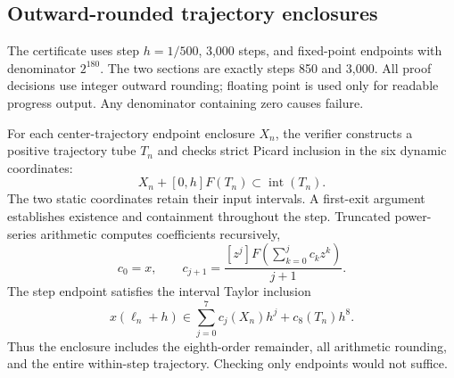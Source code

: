 \subsection{Outward-rounded trajectory enclosures}
The certificate uses step $h=1/500$, 3,000 steps, and fixed-point endpoints with denominator $2^{180}$. The two sections are exactly steps 850 and 3,000. All proof decisions use integer outward rounding; floating point is used only for readable progress output. Any denominator containing zero causes failure.

For each center-trajectory endpoint enclosure $X_n$, the verifier constructs a positive trajectory tube $T_n$ and checks strict Picard inclusion in the six dynamic coordinates:
\begin{equation}
X_n+[0,h]F(T_n)\subset\operatorname{int}(T_n).
\end{equation}
The two static coordinates retain their input intervals. A first-exit argument establishes existence and containment throughout the step. Truncated power-series arithmetic computes coefficients recursively,
\begin{equation}
c_0=x,\qquad c_{j+1}=\frac{[z^j]F(\sum_{k=0}^jc_kz^k)}{j+1}.
\end{equation}
The step endpoint satisfies the interval Taylor inclusion
\begin{equation}
x(\ell_n+h)\in\sum_{j=0}^{7}c_j(X_n)h^j+c_8(T_n)h^8.
\end{equation}
Thus the enclosure includes the eighth-order remainder, all arithmetic rounding, and the entire within-step trajectory. Checking only endpoints would not suffice.

